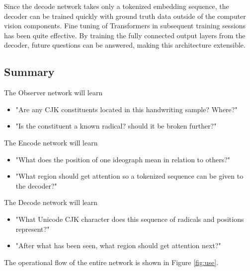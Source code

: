 Since the decode network takes only a tokenized embedding sequence, the decoder can be trained quickly with ground truth data outside of the computer vision components. Fine tuning of Transformers in subsequent training sessions has been quite effective\cite{transformers}\cite{bert}. By training the fully connected output layers from the decoder, future questions can be answered, making this architecture extensible.

\subsection{Summary}
The Observer network will learn
\begin{itemize}
    \item "Are any CJK constituents located in this handwriting sample? Where?"
    \item "Is the constituent a known radical? should it be broken further?"
\end{itemize}
The Encode network will learn
\begin{itemize}
    \item "What does the position of one ideograph mean in relation to others?"
    \item "What region should get attention so a tokenized sequence can be given to the decoder?"
\end{itemize}
The Decode network will learn
\begin{itemize}
    \item "What Unicode CJK character does this sequence of radicals and positions represent?"
    \item "After what has been seen, what region should get attention next?"
\end{itemize}

The operational flow of the entire network is shown in Figure \ref{fig:use}.

\newpage
\newcommand\tab[1][1cm]{\hspace*{#1}}
